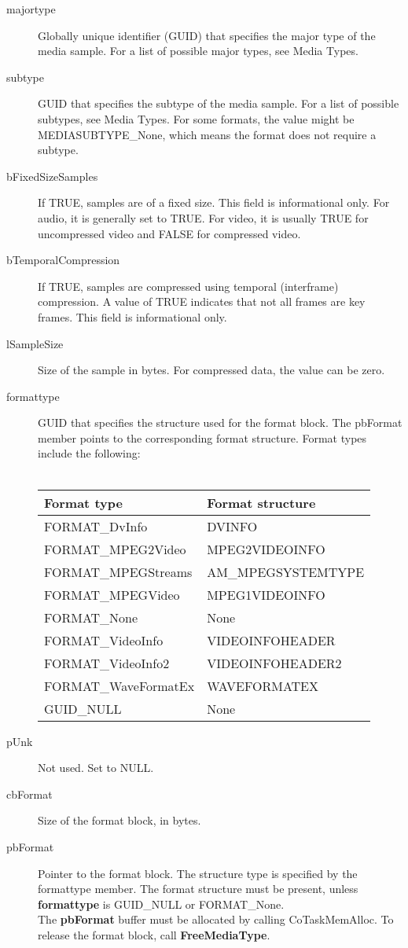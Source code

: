\begin{description}
	\item[majortype]
Globally unique identifier (GUID) that specifies the major type of the media sample. For a list of possible major types, see Media Types.
	\item[subtype] GUID that specifies the subtype of the media sample. For a list of possible subtypes, see Media Types. For some formats, the value might be MEDIASUBTYPE\_None, which means the format does not require a subtype.
	\item[bFixedSizeSamples] If TRUE, samples are of a fixed size. This field is informational only. For audio, it is generally set to TRUE. For video, it is usually TRUE for uncompressed video and FALSE for compressed video.
	\item[bTemporalCompression] If TRUE, samples are compressed using temporal (interframe) compression. A value of TRUE indicates that not all frames are key frames. This field is informational only.
	\item[lSampleSize] Size of the sample in bytes. For compressed data, the value can be zero.
	\item[formattype] GUID that specifies the structure used for the format block. The pbFormat member points to the corresponding format structure. Format types include the following:\\ \\
\begin{tabular}[h]{||l|l||}
		\hline \hline
	Format type & Format structure \\ \hline
	FORMAT\_DvInfo & DVINFO \\ \hline
	FORMAT\_MPEG2Video &	MPEG2VIDEOINFO \\ \hline
	FORMAT\_MPEGStreams & AM\_MPEGSYSTEMTYPE \\ \hline
	FORMAT\_MPEGVideo & MPEG1VIDEOINFO \\ \hline
	FORMAT\_None &	None \\ \hline
	FORMAT\_VideoInfo & VIDEOINFOHEADER \\ \hline
	FORMAT\_VideoInfo2 &	VIDEOINFOHEADER2 \\ \hline
	FORMAT\_WaveFormatEx & WAVEFORMATEX \\ \hline
	GUID\_NULL &	None \\
	\hline \hline
\end{tabular}
	\item[pUnk] Not used. Set to NULL.
	\item[cbFormat] Size of the format block, in bytes.
	\item[pbFormat] Pointer to the format block. The structure type is specified by the formattype member. The format structure must be present, unless \textbf{formattype} is GUID\_NULL or FORMAT\_None.\\The \textbf{pbFormat} buffer must be allocated by calling CoTaskMemAlloc. To release the format block, call \textbf{FreeMediaType}.	
\end{description}

